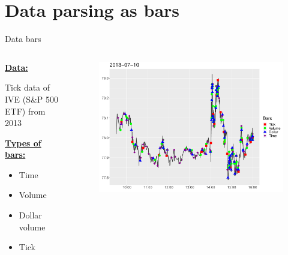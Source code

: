 \documentclass[usenames,dvipsnames]{beamer} %
\begin{document}
\section{Data parsing as bars}
\frame{\tableofcontents[currentsection]}

\begin{frame}{Data bars}
\begin{columns}
\begin{column}{.3\textwidth}

\begin{center} 
	\underline{\textbf{Data:}}
\end{center}
\vspace{-.15cm}
Tick data of IVE (S\&P 500 ETF) from 2013

\begin{center} 
	\underline{\textbf{Types of bars:}} 
\end{center}
\vspace{-.15cm}
\begin{itemize}
	\item Time
	\item Volume
	\item Dollar volume
	\item Tick
\end{itemize}

\end{column}
\begin{column}{.7\textwidth}
	\begin{figure}
		\includegraphics[width=\textwidth]{img/sampling}
	\end{figure}
\end{column}
\end{columns}
\end{frame}
\end{document}
